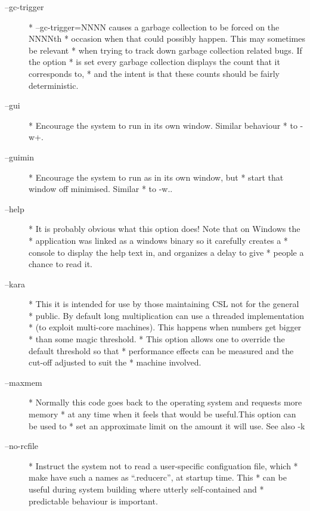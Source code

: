 \documentclass[a4paper,11pt]{article}
\begin{document}
\begin{description}
\item [{\ttfamily --gc-trigger}] 
          * --gc-trigger=NNNN causes a garbage collection to be forced on the NNNNth
          * occasion when that could possibly happen. This may sometimes be relevant
          * when trying to track down garbage collection related bugs. If the option
          * is set every garbage collection displays the count that it corresponds to,
          * and the intent is that these counts should be fairly deterministic.

\item [{\ttfamily --gui}] 
          * Encourage the system to run in its own window. Similar behaviour
          * to {\ttfamily -w+}.

\item [{\ttfamily --guimin}] 
          * Encourage the system to run as in its own window, but
          * start that window off minimised. Similar
          * to {\ttfamily -w.}.

\item [{\ttfamily --help}] 
          * It is probably obvious what this option does! Note that on Windows the
          * application was linked as a windows binary so it carefully creates a
          * console to display the help text in, and organizes a delay to give
          * people a chance to read it.

\item [{\ttfamily --kara}] 
          * This it is intended for use by those maintaining CSL not for the general
          * public. By default long multiplication can use a threaded implementation
          * (to exploit multi-core machines). This happens when numbers get bigger
          * than some magic threshold.
          * This option allows one to override the default threshold so that
          * performance effects can be measured and the cut-off adjusted to suit the
          * machine involved.

\item [{\ttfamily --maxmem}] 
          * Normally this code goes back to the operating system and requests more memory
          * at any time when it feels that would be useful.This option can be used to
          * set an approximate limit on the amount it will use. See also -k

\item [{\ttfamily --no-rcfile}] 
          * Instruct the system not to read a user-specific configuation file, which
          * make have such a names as ``{\ttfamily .reducerc}'', at startup time. This
          * can be useful during system building where utterly self-contained and
          * predictable behaviour is important.


\end{description}
\end{document}
